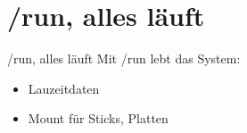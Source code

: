 \section[/run]{/run, alles läuft}
\begin{frame}{/run, alles läuft}
Mit /run lebt das System:
\begin{itemize}
 \item Lauzeitdaten
 \item Mount für Sticks, Platten
\end{itemize}


 
\end{frame}

